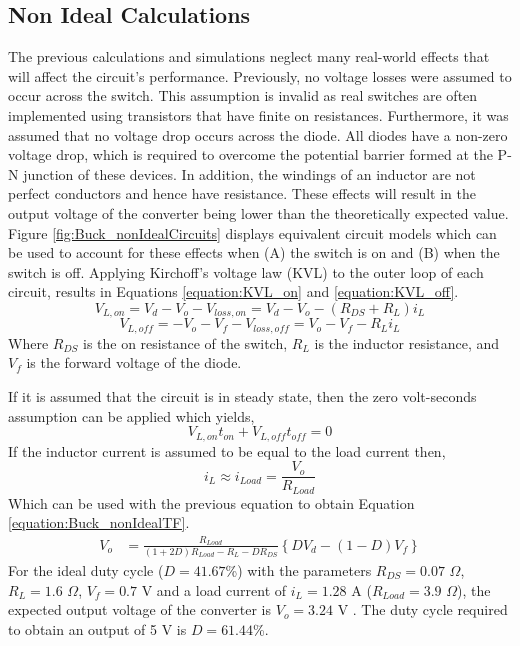 \documentclass[12pt,twoside]{scrartcl}
\begin{document}
\subsection{Non Ideal Calculations}
The previous calculations and simulations neglect many real-world effects that will affect the circuit's performance. Previously, no voltage losses were assumed to occur across the switch. This assumption is invalid as real switches are often implemented using transistors that have finite on resistances. Furthermore, it was assumed that no voltage drop occurs across the diode. All diodes have a non-zero voltage drop, which is required to overcome the potential barrier formed at the P-N junction of these devices. In addition, the windings of an inductor are not perfect conductors and hence have resistance. These effects will result in the output voltage of the converter being lower than the theoretically expected value. Figure \ref{fig:Buck_nonIdealCircuits} displays equivalent circuit models which can be used to account for these effects when (A) the switch is on and (B) when the switch is off. Applying Kirchoff’s voltage law (KVL) to the outer loop of each circuit, results in Equations \ref{equation:KVL_on} and \ref{equation:KVL_off}.
\begin{equation}
V_{L,on} = V_{d} - V_{o} - V_{loss, on} = V_{d} - V_{o} - (R_{DS}+ R_{L})i_{L} \label{equation:KVL_on}
\end{equation}
\begin{equation}
V_{L,off} = -V_{o} - V_{f} - V_{loss, off} = V_{o} - V_{f} - R_{L}i_{L}\label{equation:KVL_off}
\end{equation}
Where $R_{DS}$ is the on resistance of the switch, $R_{L}$ is the inductor resistance, and $V_{f}$ is the forward voltage of the diode.\par
\vspace{5mm}
\noindent If it is assumed that the circuit is in steady state, then the zero volt-seconds assumption can be applied which yields,
\begin{equation*}
V_{L,on}t_{on} + V_{L,off}t_{off} = 0
\end{equation*}
If the inductor current is assumed to be equal to the load current then,
\begin{equation*}
i_{L} \approx i_{Load} = \frac{V_{o}}{R_{Load}}
\end{equation*}
Which can be used with the previous equation to obtain Equation \ref{equation:Buck_nonIdealTF}.
\begin{align}
V_{o} &= \frac{R_{Load}}{(1+2D)R_{Load} - R_{L} - DR_{DS}}\left\{DV_{d} - (1-D)V_{f} \label{equation:Buck_nonIdealTF}\right\}
\end{align}
\noindent For the ideal duty cycle ($D = 41.67$\%) with the parameters $R_{DS} = 0.07$ $\Omega$, $R_{L} = 1.6$ $\Omega$, $V_{f} = 0.7$ V and a load current of $i_{L} = 1.28$ A ($R_{Load} = 3.9$ $\Omega$), the expected output voltage of the converter is $V_{o} =3.24$ V \cite{RNX1, RNX0, RNX2}. The duty cycle required to obtain an output of 5 V is $D = 61.44$\%.
\end{document}
